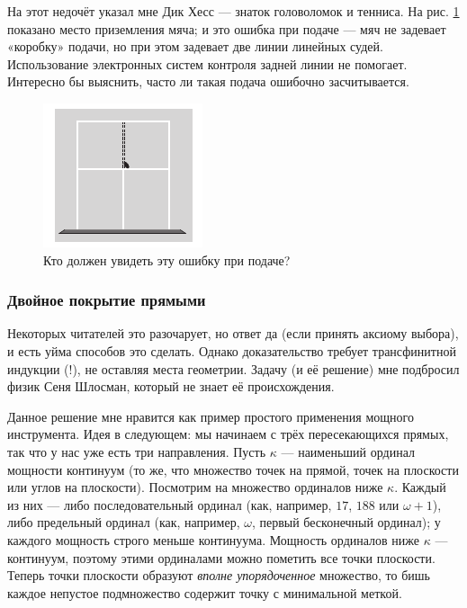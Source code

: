 На этот недочёт указал мне Дик Хесс --- знаток головоломок и тенниса.
На рис. \ref{pic:tenis} показано место приземления мяча; и это ошибка при подаче --- мяч не задевает «коробку» подачи, но при этом задевает две линии линейных судей. 
Использование электронных систем контроля задней линии не помогает.
Интересно бы выяснить, часто ли такая подача ошибочно засчитывается.

\begin{figure}[ht!]
\centering
\includegraphics[scale=1]{pics/tenis}
\caption{Кто должен увидеть эту ошибку при подаче?}
\label{pic:tenis}
\end{figure}


\subsubsection*{Двойное покрытие прямыми}


Некоторых читателей это разочарует, но ответ да (если принять аксиому выбора), и есть уйма способов это сделать. 
Однако доказательство требует трансфинитной индукции (!), не оставляя места геометрии.
Задачу (и её решение) мне подбросил физик Сеня Шлосман, который не знает её происхождения.

Данное решение мне нравится как пример простого применения мощного инструмента.
Идея в следующем: мы начинаем с трёх пересекающихся прямых, так что у нас уже есть три направления.
Пусть $\kappa$ --- наименьший ординал мощности континуум (то же, что множество точек на прямой, точек на плоскости или углов на плоскости).
Посмотрим на множество ординалов ниже $\kappa$.
Каждый из них --- либо последовательный ординал (как, например, $17$, $188$ или $\omega + 1$), либо предельный ординал (как, например, $\omega$, первый бесконечный ординал); у каждого мощность строго меньше континуума.
Мощность ординалов ниже $\kappa$ --- континуум, поэтому этими ординалами можно пометить все точки плоскости.
Теперь точки плоскости образуют \emph{вполне упорядоченное} множество, то бишь каждое непустое подмножество содержит точку с минимальной меткой.

